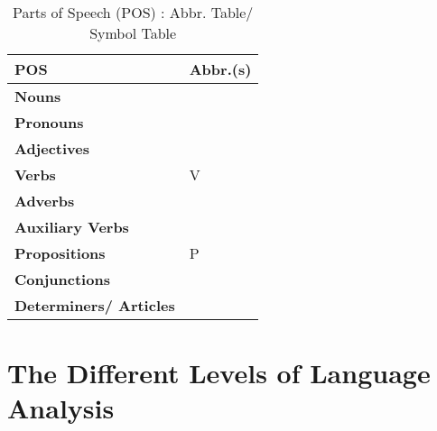 \begin{longtable}{|m{3cm}|m{1.3cm}|}
    \caption{Parts of Speech (POS) : Abbr. Table/ Symbol Table} \\ \hline
    
    \textbf{POS} & \textbf{Abbr.(s)} \\ \hline
    \endfirsthead
    
    \hline
    \endhead
    
    \hline
    \endfoot
    
    \hline
    \endlastfoot

    \textbf{Nouns} & \\ \hline
    \textbf{Pronouns} & \\ \hline
    \textbf{Adjectives} & \\ \hline
    \textbf{Verbs} & V \\ \hline
    \textbf{Adverbs} & \\ \hline
    \textbf{Auxiliary Verbs} &  \\ \hline
    \textbf{Propositions} & P \\ \hline
    \textbf{Conjunctions} &  \\ \hline
    \textbf{Determiners/ Articles} & \\ \hline

\end{longtable}

\section{The Different Levels of Language Analysis \cite{medium-levels-in-natural-language-processing-nlp}}


